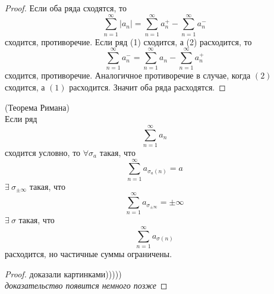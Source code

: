 \begin{proof}
    Если оба ряда сходятся, то
    \[\sum_{n=1}^{\infty}|a_n|=\sum_{n=1}^{\infty}a_n^+-\sum_{n=1}^{\infty}a_n^-\]
    сходится, противоречие.
    Если ряд (1) сходится, а (2) расходится, то
    \[\sum_{n=1}^{\infty}a_n^-=\sum_{n=1}^{\infty}a_n-\sum_{n=1}^{\infty}a_n^+\]
    сходится, противоречие. Аналогичное противоречие в случае, когда $(2)$ сходится, а $(1)$ расходится. Значит оба ряда расходятся.
\end{proof}
\begin{theorem} (Теорема Римана)\\
    Если ряд
    \[\sum_{n=1}^{\infty}a_n\]
    сходится условно, то $\forall \sigma_a$ такая, что
    \[\sum_{n=1}^{\infty}a_{\sigma_a(n)}=a\]
    $\exists\ \sigma_{\pm \infty}$ такая, что
    \[\sum_{n=1}^{\infty}a_{\sigma_{\pm \infty}}=\pm \infty\]
    $\exists\ \sigma$ такая, что
    \[\sum_{n=1}^{\infty}a_{\sigma(n)}\]
    расходится, но частичные суммы ограничены.
\end{theorem}
\begin{proof}
    доказали картинками)))))\\
    \textit{доказательство появится немного позже}
\end{proof}